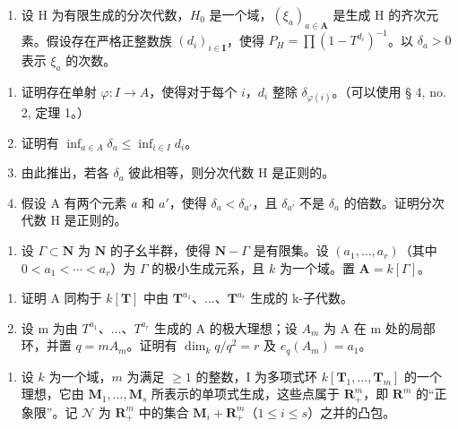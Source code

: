 \begin{enumerate}
\def\labelenumi{\arabic{enumi})}
\setcounter{enumi}{11}
\tightlist
\item
  设 H 为有限生成的分次代数，\(H_{0}\) 是一个域，\((\xi_{a})_{a\in\mathbf{A}}\) 是生成 H 的齐次元素。假设存在严格正整数族 \((d_{i})_{i\in\mathbf{I}}\)，使得 \(P_{H}=\prod(1-T^{d_{i}})^{-1}\)。以 \(\delta_{a}>0\) 表示 \(\xi_{a}\) 的次数。
\end{enumerate}

\begin{enumerate}
\def\labelenumi{\alph{enumi})}
\item
  证明存在单射 \(\varphi: I \to A\)，使得对于每个 \(i\)，\(d_i\) 整除 \(\delta_{\varphi(i)}\)。（可以使用 § 4, no. 2, 定理 1。）
\item
  证明有 \(\inf_{a \in A} \delta_a \leqslant \inf_{i \in I} d_i\)。
\item
  由此推出，若各 \(\delta_{a}\) 彼此相等，则分次代数 H 是正则的。
\item
  假设 A 有两个元素 \(a\) 和 \(a'\)，使得 \(\delta_{a} < \delta_{a'}\)，且 \(\delta_{a'}\) 不是 \(\delta_{a}\) 的倍数。证明分次代数 H 是正则的。
\end{enumerate}


\begin{enumerate}
\def\labelenumi{\arabic{enumi})}
\tightlist
\item
  设 \(\Gamma \subset \mathbf{N}\) 为 \(\mathbf{N}\) 的子幺半群，使得 \(\mathbf{N} - \Gamma\) 是有限集。设 \((a_1, \ldots, a_r)\)（其中 \(0 < a_1 < \cdots < a_r\)）为 \(\Gamma\) 的极小生成元系，且 \(k\) 为一个域。置 \(\mathbf{A} = k[\Gamma]\)。
\end{enumerate}

\begin{enumerate}
\def\labelenumi{\alph{enumi})}
\item
  证明 A 同构于 \(k[\mathbf{T}]\) 中由 \(\mathbf{T}^{a_1}\)、\(\ldots\)、\(\mathbf{T}^{a_r}\) 生成的 k-子代数。
\item
  设 m 为由 \(T^{a_{1}}\)、\(\ldots\)、\(T^{a_{r}}\) 生成的 A 的极大理想；设 \(A_{m}\) 为 A 在 m 处的局部环，并置 \(q = mA_{m}\)。证明有 \(\dim_{k}q/q^{2} = r\) 及 \(e_{q}(A_{m}) = a_{1}\)。
\end{enumerate}

\begin{enumerate}
\def\labelenumi{\arabic{enumi})}
\setcounter{enumi}{1}
\tightlist
\item
  设 \(k\) 为一个域，\(m\) 为满足 \(\geqslant 1\) 的整数，I 为多项式环 \(k[\mathbf{T}_{1},\ldots,\mathbf{T}_{m}]\) 的一个理想，它由 \(\mathbf{M}_{1},\ldots,\mathbf{M}_{s}\) 所表示的单项式生成，这些点属于 \(\mathbf{R}_{+}^{m}\)，即 \(\mathbf{R}^{m}\) 的“正象限”。记 \(\mathcal{N}\) 为 \(\mathbf{R}_{+}^{m}\) 中的集合 \(\mathbf{M}_{i}+\mathbf{R}_{+}^{m}\)（\(1\leqslant i\leqslant s\)）之并的凸包。
\end{enumerate}

